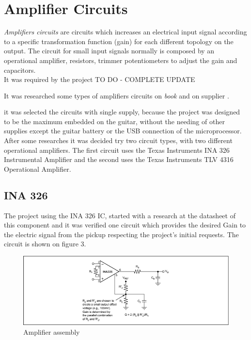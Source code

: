 \chapter{Amplifier Circuits}
\textit{Amplifiers circuits} \cite{amplifier-circuit} are circuits which increases an electrical input signal according
to a specific transformation function (gain) for each different topology on the output. The circuit for small input signals
normally is composed by an operational amplifier, resistors, trimmer potentiometers to adjust the gain and capacitors.\\

It was required by the project TO DO - COMPLETE UPDATE


It was researched some types of amplifiers circuits on \textit{book} \cite{Millmann} and on supplier  \cite{OpAmps}.

it was selected the circuits
with single supply, because the project was designed to be the maximum embedded
on the guitar, without the needing of other supplies except the guitar battery
or the USB connection of the microprocessor.
After some researches it was decided try two circuit types, with two different
operational amplifiers. The first circuit uses the Texas Instruments INA 326
Instrumental Amplifier and the second uses the Texas Instruments TLV 4316 Operational Amplifier.

\section{INA 326}
The project using the INA 326 IC, started with a research at the datasheet of
this component and it was verified one circuit which provides the desired Gain to
the electric signal from the pickup respecting the project's initial requests.
The circuit is shown on figure 3.

\begin{figure}[!htpb]
\centering
\includegraphics[scale=0.8]{images/Texas}
\caption{Amplifier assembly}
\end{figure}

